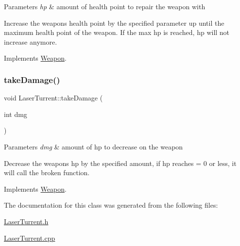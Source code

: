 \begin{DoxyParams}{Parameters}
{\em hp} & amount of health point to repair the weapon with\\
\hline
\end{DoxyParams}
Increase the weapons health point by the specified parameter up until the maximum health point of the weapon. If the max hp is reached, hp will not increase anymore. 

Implements \hyperlink{classWeapon}{Weapon}.

\mbox{\label{classLaserTurrent_a8f84af30ae6040de5c5d291dc890d804}} 
\subsubsection{\texorpdfstring{take\+Damage()}{takeDamage()}}
{\footnotesize\ttfamily void Laser\+Turrent\+::take\+Damage (\begin{DoxyParamCaption}\item[{int}]{dmg }\end{DoxyParamCaption})\hspace{0.3cm}{\ttfamily [virtual]}}


\begin{DoxyParams}{Parameters}
{\em dmg} & amount of hp to decrease on the weapon\\
\hline
\end{DoxyParams}
Decrease the weapons hp by the specified amount, if hp reaches = 0 or less, it will call the broken function. 

Implements \hyperlink{classWeapon}{Weapon}.



The documentation for this class was generated from the following files\+:\begin{DoxyCompactItemize}
\item 
\hyperlink{LaserTurrent_8h}{Laser\+Turrent.\+h}\item 
\hyperlink{LaserTurrent_8cpp}{Laser\+Turrent.\+cpp}\end{DoxyCompactItemize}
